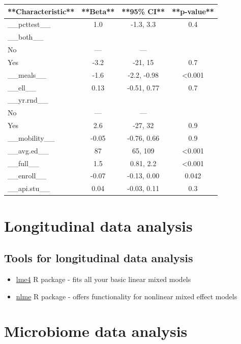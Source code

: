 \documentclass[
]{book}
\begin{document}
\begin{tabular}{l|c|c|c}
\hline
**Characteristic** & **Beta** & **95\% CI** & **p-value**\\
\hline
\_\_pcttest\_\_ & 1.0 & -1.3, 3.3 & 0.4\\
\hline
\_\_both\_\_ &  &  & \\
\hline
No & — & — & \\
\hline
Yes & -3.2 & -21, 15 & 0.7\\
\hline
\_\_meals\_\_ & -1.6 & -2.2, -0.98 & <0.001\\
\hline
\_\_ell\_\_ & 0.13 & -0.51, 0.77 & 0.7\\
\hline
\_\_yr.rnd\_\_ &  &  & \\
\hline
No & — & — & \\
\hline
Yes & 2.6 & -27, 32 & 0.9\\
\hline
\_\_mobility\_\_ & -0.05 & -0.76, 0.66 & 0.9\\
\hline
\_\_avg.ed\_\_ & 87 & 65, 109 & <0.001\\
\hline
\_\_full\_\_ & 1.5 & 0.81, 2.2 & <0.001\\
\hline
\_\_enroll\_\_ & -0.07 & -0.13, 0.00 & 0.042\\
\hline
\_\_api.stu\_\_ & 0.04 & -0.03, 0.11 & 0.3\\
\hline
\end{tabular}

\hypertarget{longitudinal-data-analysis}{%
\chapter{Longitudinal data analysis}\label{longitudinal-data-analysis}}

\hypertarget{tools-for-longitudinal-data-analysis}{%
\section{Tools for longitudinal data analysis}\label{tools-for-longitudinal-data-analysis}}

\begin{itemize}
\item
  \href{https://cran.r-project.org/web/packages/lme4/index.html}{lme4} R package - fits all your basic linear mixed models
\item
  \href{https://cran.r-project.org/web/packages/nlme/index.html}{nlme} R package - offers functionality for nonlinear mixed effect models
\end{itemize}

\hypertarget{microbiome-data-analysis}{%
\chapter{Microbiome data analysis}\label{microbiome-data-analysis}}
\end{document}
